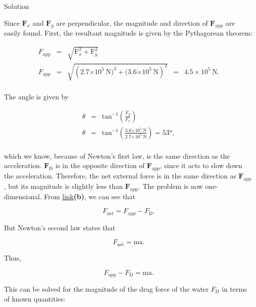 \documentclass[
]{book}
\begin{document}
{Solution}

Since \(\textbf{F}_{x}{}\)\emph{} and
\(\textbf{F}_{y}{}\)\emph{} are perpendicular,
the magnitude and direction of \(\textbf{F}_{\text{app}}{}\) are easily
found. First, the resultant magnitude is given by the Pythagorean
theorem:

\leavevmode{}%
\[\begin{array}{lllll}
F_{\text{app}} & = & \sqrt{\text{F}_{x}^{2} + \text{F}_{y}^{2}} & & \\
F_{\text{app}} & = & \sqrt{(2.7{\times \text{10}^{5}}\ \text{N}{)^{2} + (}3.6{\times \text{10}^{5}}\ \text{N})^{2}} & = & {{4.5 \times \text{10}^{5}}\ \text{N.}} \\
\end{array}{}\]

The angle is given by

\leavevmode{}%
\[\begin{array}{lll}
\theta & = & {\text{tan}^{- 1}\left( \frac{F_{y}}{F_{x}} \right)} \\
\theta & = & {\text{tan}^{- 1}{\left( \frac{3.6{\times \text{10}^{5}}\ \text{N}}{2.7{\times \text{10}^{5}}\ \text{N}} \right) = \text{53º}},} \\
\end{array}{}\]

which we know, because of Newton's first law, is the same direction as
the acceleration. \(\textbf{F}_{\text{D}}{}\) is in the opposite direction
of \(\textbf{F}_{\text{app}}{}\), since it acts to slow down the
acceleration. Therefore, the net external force is in the same direction
as \(\textbf{F}_{\text{app}}{}\), but its magnitude is slightly less than
\(\textbf{F}_{\text{app}}{}\). The problem is now one-dimensional. From
\protect\hyperlink{import-auto-id1221020}{link}\textbf{(b)}, we can
see that

\leavevmode{}%
\[{F_{\text{net}} = {F_{\text{app}} - F_{\text{D}}}}.\]

But Newton's second law states that

\leavevmode{}%
\[{F_{\text{net}} = \text{ma}}.\]

Thus,

\leavevmode{}%
\[{{F_{\text{app}} - F_{\text{D}}} = \text{ma}}.\]

This can be solved for the magnitude of the drag force of the water
\(F_{\text{D}}{}\) in terms of known quantities:
\end{document}
